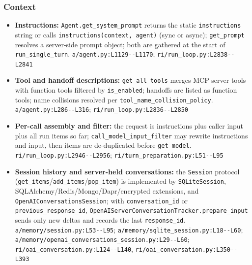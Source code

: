 \subsubsection*{Context}
\begin{itemize}
\item \textbf{Instructions:} \texttt{Agent.\allowbreak{}get\_\allowbreak{}system\_\allowbreak{}prompt} returns the static \texttt{instructions} string or calls \texttt{instructions(\allowbreak{}context, agent)} (sync or async); \texttt{get\_\allowbreak{}prompt} resolves a server-side prompt object; both are gathered at the start of \texttt{run\_\allowbreak{}single\_\allowbreak{}turn}. \texttt{a/\allowbreak{}agent.\allowbreak{}py:\allowbreak{}L1129-\allowbreak{}-\allowbreak{}L1170}; \texttt{ri/\allowbreak{}run\_\allowbreak{}loop.\allowbreak{}py:\allowbreak{}L2838-\allowbreak{}-\allowbreak{}L2841}
\item \textbf{Tool and handoff descriptions:} \texttt{get\_\allowbreak{}all\_\allowbreak{}tools} merges MCP server tools with function tools filtered by \texttt{is\_\allowbreak{}enabled}; handoffs are listed as function tools; name collisions resolved per \texttt{tool\_\allowbreak{}name\_\allowbreak{}collision\_\allowbreak{}policy}. \texttt{a/\allowbreak{}agent.\allowbreak{}py:\allowbreak{}L286-\allowbreak{}-\allowbreak{}L316}; \texttt{ri/\allowbreak{}run\_\allowbreak{}loop.\allowbreak{}py:\allowbreak{}L2836-\allowbreak{}-\allowbreak{}L2850}
\item \textbf{Per-call assembly and filter:} the request is instructions plus caller input plus all run items so far; \texttt{call\_\allowbreak{}model\_\allowbreak{}input\_\allowbreak{}filter} may rewrite instructions and input, then items are de-duplicated before \texttt{get\_\allowbreak{}model}. \texttt{ri/\allowbreak{}run\_\allowbreak{}loop.\allowbreak{}py:\allowbreak{}L2946-\allowbreak{}-\allowbreak{}L2956}; \texttt{ri/\allowbreak{}turn\_\allowbreak{}preparation.\allowbreak{}py:\allowbreak{}L51-\allowbreak{}-\allowbreak{}L95}
\item \textbf{Session history and server-held conversations:} the \texttt{Session} protocol (\texttt{get\_\allowbreak{}items}/\texttt{add\_\allowbreak{}items}/\texttt{pop\_\allowbreak{}item}) is implemented by \texttt{SQLiteSession}, SQLAlchemy/Redis/Mongo/Dapr/encrypted extensions, and \texttt{OpenAIConversationsSession}; with \texttt{conversation\_\allowbreak{}id} or \texttt{previous\_\allowbreak{}response\_\allowbreak{}id}, \texttt{OpenAIServerConversationTracker.\allowbreak{}prepare\_\allowbreak{}input} sends only new deltas and records the last \texttt{response\_\allowbreak{}id}. \texttt{a/\allowbreak{}memory/\allowbreak{}session.\allowbreak{}py:\allowbreak{}L53-\allowbreak{}-\allowbreak{}L95}; \texttt{a/\allowbreak{}memory/\allowbreak{}sqlite\_\allowbreak{}session.\allowbreak{}py:\allowbreak{}L18-\allowbreak{}-\allowbreak{}L60}; \texttt{a/\allowbreak{}memory/\allowbreak{}openai\_\allowbreak{}conversations\_\allowbreak{}session.\allowbreak{}py:\allowbreak{}L29-\allowbreak{}-\allowbreak{}L60}; \texttt{ri/\allowbreak{}oai\_\allowbreak{}conversation.\allowbreak{}py:\allowbreak{}L124-\allowbreak{}-\allowbreak{}L140}, \texttt{ri/\allowbreak{}oai\_\allowbreak{}conversation.\allowbreak{}py:\allowbreak{}L350-\allowbreak{}-\allowbreak{}L393}

\end{itemize}
